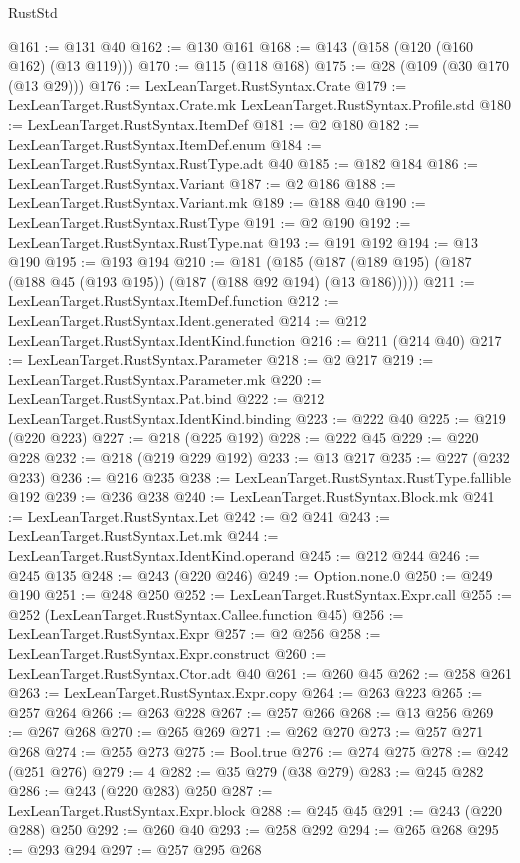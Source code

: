 \begin{lexlean}{RustStd}
\begin{coremodule}
@161 := @131 @40
@162 := @130 @161
@168 := @143 (@158 (@120 (@160 @162) (@13 @119)))
@170 := @115 (@118 @168)
@175 := @28 (@109 (@30 @170 (@13 @29)))
@176 := LexLeanTarget.RustSyntax.Crate
@179 := LexLeanTarget.RustSyntax.Crate.mk LexLeanTarget.RustSyntax.Profile.std
@180 := LexLeanTarget.RustSyntax.ItemDef
@181 := @2 @180
@182 := LexLeanTarget.RustSyntax.ItemDef.enum
@184 := LexLeanTarget.RustSyntax.RustType.adt @40
@185 := @182 @184
@186 := LexLeanTarget.RustSyntax.Variant
@187 := @2 @186
@188 := LexLeanTarget.RustSyntax.Variant.mk
@189 := @188 @40
@190 := LexLeanTarget.RustSyntax.RustType
@191 := @2 @190
@192 := LexLeanTarget.RustSyntax.RustType.nat
@193 := @191 @192
@194 := @13 @190
@195 := @193 @194
@210 := @181
    (@185 (@187 (@189 @195) (@187 (@188 @45 (@193 @195)) (@187 (@188 @92 @194) (@13 @186)))))
@211 := LexLeanTarget.RustSyntax.ItemDef.function
@212 := LexLeanTarget.RustSyntax.Ident.generated
@214 := @212 LexLeanTarget.RustSyntax.IdentKind.function
@216 := @211 (@214 @40)
@217 := LexLeanTarget.RustSyntax.Parameter
@218 := @2 @217
@219 := LexLeanTarget.RustSyntax.Parameter.mk
@220 := LexLeanTarget.RustSyntax.Pat.bind
@222 := @212 LexLeanTarget.RustSyntax.IdentKind.binding
@223 := @222 @40
@225 := @219 (@220 @223)
@227 := @218 (@225 @192)
@228 := @222 @45
@229 := @220 @228
@232 := @218 (@219 @229 @192)
@233 := @13 @217
@235 := @227 (@232 @233)
@236 := @216 @235
@238 := LexLeanTarget.RustSyntax.RustType.fallible @192
@239 := @236 @238
@240 := LexLeanTarget.RustSyntax.Block.mk
@241 := LexLeanTarget.RustSyntax.Let
@242 := @2 @241
@243 := LexLeanTarget.RustSyntax.Let.mk
@244 := LexLeanTarget.RustSyntax.IdentKind.operand
@245 := @212 @244
@246 := @245 @135
@248 := @243 (@220 @246)
@249 := Option.none.{0}
@250 := @249 @190
@251 := @248 @250
@252 := LexLeanTarget.RustSyntax.Expr.call
@255 := @252 (LexLeanTarget.RustSyntax.Callee.function @45)
@256 := LexLeanTarget.RustSyntax.Expr
@257 := @2 @256
@258 := LexLeanTarget.RustSyntax.Expr.construct
@260 := LexLeanTarget.RustSyntax.Ctor.adt @40
@261 := @260 @45
@262 := @258 @261
@263 := LexLeanTarget.RustSyntax.Expr.copy
@264 := @263 @223
@265 := @257 @264
@266 := @263 @228
@267 := @257 @266
@268 := @13 @256
@269 := @267 @268
@270 := @265 @269
@271 := @262 @270
@273 := @257 @271 @268
@274 := @255 @273
@275 := Bool.true
@276 := @274 @275
@278 := @242 (@251 @276)
@279 := 4
@282 := @35 @279 (@38 @279)
@283 := @245 @282
@286 := @243 (@220 @283) @250
@287 := LexLeanTarget.RustSyntax.Expr.block
@288 := @245 @45
@291 := @243 (@220 @288) @250
@292 := @260 @40
@293 := @258 @292
@294 := @265 @268
@295 := @293 @294
@297 := @257 @295 @268

\end{coremodule}
\end{lexlean}
